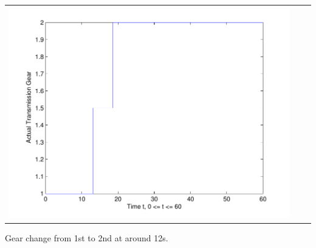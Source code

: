 \documentclass{seminar}
\begin{document}
\begin{slide}
\begin{tabular}{ccc}
\includegraphics[angle=0,scale=0.22]{Gear-tps50-grade1} 
\end{tabular}

Gear change from 1st to 2nd at around 12s.
\end{slide}
\end{document}
